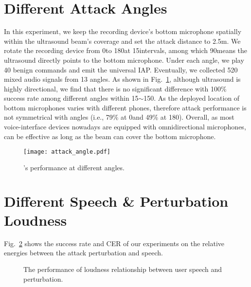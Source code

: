 \section{Different Attack Angles}\label{append:eval_angles}
In this experiment, we keep the recording device's bottom microphone spatially within the ultrasound beam's coverage and set the attack distance to 2.5m. We rotate the recording device from 0\degree to 180\degree at 15\degree intervals, among which 90\degree means the ultrasound directly points to the bottom microphone. Under each angle, we play 40 benign commands and emit the universal IAP.
Eventually, we collected 520 mixed audio signals from 13 angles. As shown in Fig.~\ref{fig:attack_angle}, although ultrasound is highly directional, we find that there is no significant difference with 100\% success rate among different angles within 15\degree$\sim$150\degree. As the deployed location of bottom microphones varies with different phones, therefore attack performance is not symmetrical with angles (i.e., 79\% at 0\degree and 49\% at 180\degree). Overall, as most voice-interface devices nowadays are equipped with omnidirectional microphones, \alias can be effective as long as the beam can cover the bottom microphone. 
\begin{figure}[h]
    \centering
    \texttt{[image: attack\_angle.pdf]}
    \caption{\alias's performance at different angles.}
    \label{fig:attack_angle}
\end{figure}


\section{Different Speech \& Perturbation Loudness}\label{append:loudness_compare}
Fig.~\ref{fig:loudness_compare} shows the success rate and CER of our experiments on the relative energies between the attack perturbation and speech.
\begin{figure}[h]
	\centering  %
	\caption{The performance of loudness relationship between user speech and perturbation.}    %
	\label{fig:loudness_compare}    %
\end{figure}

